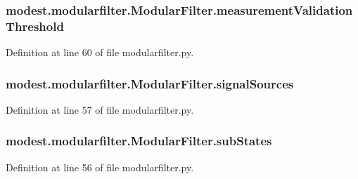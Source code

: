 \subsubsection[{\texorpdfstring{measurement\+Validation\+Threshold}{measurementValidationThreshold}}]{\setlength{\rightskip}{0pt plus 5cm}modest.\+modularfilter.\+Modular\+Filter.\+measurement\+Validation\+Threshold}\hypertarget{classmodest_1_1modularfilter_1_1ModularFilter_af91295c2d8f45afe04386215b5fa39aa}{}\label{classmodest_1_1modularfilter_1_1ModularFilter_af91295c2d8f45afe04386215b5fa39aa}


Definition at line 60 of file modularfilter.\+py.

\subsubsection[{\texorpdfstring{signal\+Sources}{signalSources}}]{\setlength{\rightskip}{0pt plus 5cm}modest.\+modularfilter.\+Modular\+Filter.\+signal\+Sources}\hypertarget{classmodest_1_1modularfilter_1_1ModularFilter_a545ac50ec6f67f29ad3420cfc5581812}{}\label{classmodest_1_1modularfilter_1_1ModularFilter_a545ac50ec6f67f29ad3420cfc5581812}


Definition at line 57 of file modularfilter.\+py.

\subsubsection[{\texorpdfstring{sub\+States}{subStates}}]{\setlength{\rightskip}{0pt plus 5cm}modest.\+modularfilter.\+Modular\+Filter.\+sub\+States}\hypertarget{classmodest_1_1modularfilter_1_1ModularFilter_a80c66c525d5afd61271f13da47148c5d}{}\label{classmodest_1_1modularfilter_1_1ModularFilter_a80c66c525d5afd61271f13da47148c5d}


Definition at line 56 of file modularfilter.\+py.

